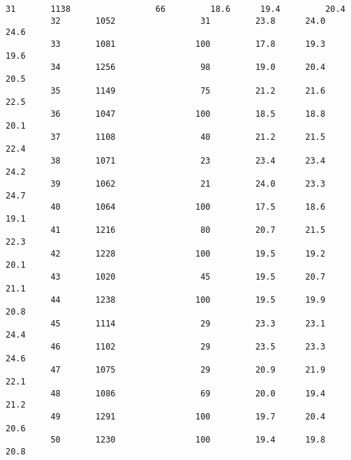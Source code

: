 \documentclass[11pt]{article}
\begin{document}
\begin{Verbatim}[commandchars=\\\{\}]
         31       1138                 66         18.6      19.4         20.4   
         32       1052                 31         23.8      24.0         24.6   
         33       1081                100         17.8      19.3         19.6   
         34       1256                 98         19.0      20.4         20.5   
         35       1149                 75         21.2      21.6         22.5   
         36       1047                100         18.5      18.8         20.1   
         37       1108                 40         21.2      21.5         22.4   
         38       1071                 23         23.4      23.4         24.2   
         39       1062                 21         24.0      23.3         24.7   
         40       1064                100         17.5      18.6         19.1   
         41       1216                 80         20.7      21.5         22.3   
         42       1228                100         19.5      19.2         20.1   
         43       1020                 45         19.5      20.7         21.1   
         44       1238                100         19.5      19.9         20.8   
         45       1114                 29         23.3      23.1         24.4   
         46       1102                 29         23.5      23.3         24.6   
         47       1075                 29         20.9      21.9         22.1   
         48       1086                 69         20.0      19.4         21.2   
         49       1291                100         19.7      20.4         20.6   
         50       1230                100         19.4      19.8         20.8   
         

\end{Verbatim}
\end{document}
